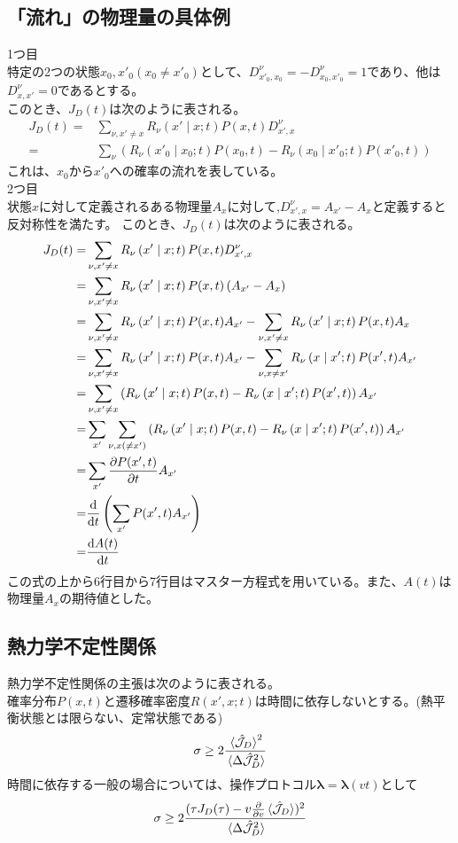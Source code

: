 \documentclass{ltjsarticle}
\begin{document}
\subsection{「流れ」の物理量の具体例}
1つ目\\
特定の2つの状態$x_0,x'_0(x_0\neq x'_0)$として、$D^{\nu}_{x'_0,x_0}=-D^{\nu}_{x_0,x'_0}=1$であり、他は$D^{\nu}_{x,x'}=0$であるとする。\\
このとき、$J_D(t)$は次のように表される。
\begin{align}
  J_D(t)=&\sum_{\nu,x'\neq x}R_{\nu}\left(x'\mid x;t\right)P(x,t)D^{\nu}_{x',x}\\
  =&\sum_\nu\left( R_{\nu}\left(x'_0\mid x_0;t\right)P(x_0,t)-R_{\nu}\left(x_0\mid x'_0;t\right)P(x'_0,t) \right)
\end{align}
これは、$x_0$から$x'_0$への確率の流れを表している。\\
2つ目\\
状態$x$に対して定義されるある物理量$A_x$に対して,$D^\nu_{x',x}=A_{x'}-A_x$と定義すると反対称性を満たす。
このとき、$J_D(t)$は次のように表される。
\begin{align}
  J_D(t)=&\sum_{\nu,x'\neq x}R_{\nu}\left(x'\mid x;t\right)P(x,t)D^{\nu}_{x',x}\\
  =&\sum_{\nu,x'\neq x}R_{\nu}\left(x'\mid x;t\right)P(x,t)\left( A_{x'}-A_x \right) \\
  =&\sum_{\nu,x'\neq x}R_{\nu}\left(x'\mid x;t\right)P(x,t)A_{x'}-\sum_{\nu,x'\neq x}R_{\nu}\left(x'\mid x;t\right)P(x,t)A_x \\
  =&\sum_{\nu,x'\neq x}R_{\nu}\left(x'\mid x;t\right)P(x,t)A_{x'}-\sum_{\nu,x\neq x'}R_{\nu}\left(x\mid x';t\right)P(x',t)A_{x'} \\
  =&\sum_{\nu,x'\neq x}\left( R_{\nu}\left(x'\mid x;t\right)P(x,t)- R_{\nu}\left(x\mid x';t\right)P(x',t)\right) A_{x'}\\
  =&\sum_{x'}\sum_{\nu,x(\neq x')}\left( R_{\nu}\left(x'\mid x;t\right)P(x,t)- R_{\nu}\left(x\mid x';t\right)P(x',t)\right) A_{x'}\\
  =&\sum_{x'}\pdv{P(x',t)}{t}A_{x'}\\
  =&\dv{t}\left( \sum_{x'}P(x',t)A_{x'} \right) \\
  =&\dv{A(t)}{t}
\end{align}
この式の上から6行目から7行目はマスター方程式を用いている。また、$A(t)$は物理量$A_x$の期待値とした。\\

\subsection{熱力学不定性関係}
熱力学不定性関係の主張は次のように表される。\\
確率分布$P(x,t)$と遷移確率密度$R(x',x;t)$は時間に依存しないとする。(熱平衡状態とは限らない、定常状態である)
\begin{align}
  \sigma\ge 2\frac{\ev*{\hat{\mathcal{J}}_D}^2}{\ev*{\Delta\hat{\mathcal{J}}_D^2}}
\end{align}
時間に依存する一般の場合については、操作プロトコル$\bm{\lambda}=\bm{\lambda}(vt)$として
\begin{align}
  \sigma\ge 2\frac{(\tau J_D(\tau)-v\pdv{v}\ev*{\hat{\mathcal{J}}_D})^2}{\ev*{\Delta\hat{\mathcal{J}}_D^2}}
\end{align}
\end{document}
